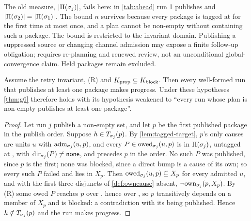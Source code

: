 The old measure, $|\Pi(\sigma_j)|$, fails here: in \cref{tab:ahead} run 1
publishes  and $|\Pi(\sigma_2)| = |\Pi(\sigma_1)|$. The bound $n$
survives because every package is tagged at \Head{} for the first time at most
once, and a plan cannot be non-empty without containing such a package. The
bound is restricted to the invariant domain. Publishing a suppressed
source or changing channel admission may expose a finite follow-up obligation;
 requires re-planning and renewed review, not an unconditional
global-convergence claim. Held packages remain excluded.

\begin{proposition}
\label{prop:progress}
Assume the retry invariant, (R) and $K_{\mathrm{prop}} \subseteq K_{\mathrm{block}}$. Then every
well-formed run that publishes at least one package makes progress. Under
these hypotheses \cref{thm:g6} therefore holds with its hypothesis weakened
to ``every run whose plan is non-empty publishes at least one package''.
\end{proposition}

\begin{proof}
Let run $j$ publish a non-empty set, and let $p$ be the first published
package in the publish order. Suppose $h \in T_{\sigma_j}(p)$. By
\cref{lem:tagged-target}, $p$'s only causes are units $u$ with
$\mathrm{adm}_{\sigma_j}(u,p)$, and every $P \in \mathrm{owed}_{\sigma_j}(u,p)$ is in
$\Pi(\sigma_j)$, untagged at \Head{}, with $\mathrm{dir}_{\sigma_j}(P) \neq \mathsf{none}$, and
precedes $p$ in the order. No such $P$ was published, since $p$ is the first;
none was blocked, since a direct bump is a cause of its own; so every such $P$
failed and lies in $X_p$. Then $\mathrm{owed}_{\sigma_j}(u,p) \subseteq X_p$ for every
admitted $u$, and with the first three disjuncts of \cref{def:owncause} absent,
$\lnot\mathrm{own}_{\sigma_j}(p,X_p)$. By (R) some owed $P$ reaches $p$ over
\Kprop{}, hence over \Kblock{}, so $p$ transitively depends on a member of
$X_p$ and is blocked: a contradiction with its being published. Hence $h
\notin T_{\sigma_j}(p)$ and the run makes progress.
\end{proof}

